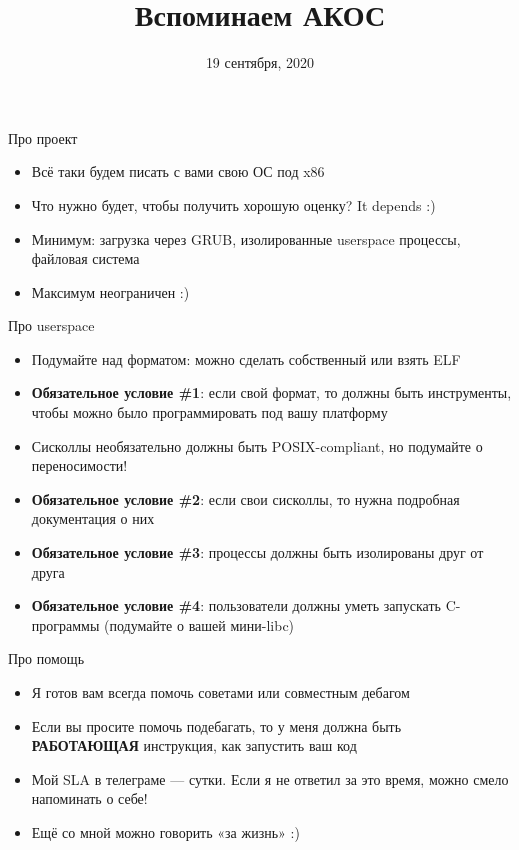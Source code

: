 \documentclass[10pt,pdf,hyperref={unicode}]{beamer}
\title{Вспоминаем АКОС}
\date{19 сентября, 2020}
\begin{document}
\begin{frame}
  \titlepage
\end{frame}

\begin{frame}{Про проект}
\begin{itemize}
    \item Всё таки будем писать с вами свою ОС под x86
    \item Что нужно будет, чтобы получить хорошую оценку?  It depends :)
    \item Минимум: загрузка через GRUB, изолированные userspace процессы, файловая система
    \item Максимум неограничен :)
\end{itemize}
\end{frame}

\begin{frame}{Про userspace}
\begin{itemize}
    \item Подумайте над форматом: можно сделать собственный или взять ELF
    \item \textbf{Обязательное условие \#1}: если свой формат, то должны быть инструменты, чтобы можно было программировать под вашу платформу
    \item Сисколлы необязательно должны быть POSIX-compliant, но подумайте о переносимости!
    \item \textbf{Обязательное условие \#2}: если свои сисколлы, то нужна подробная документация о них
    \item \textbf{Обязательное условие \#3}: процессы должны быть изолированы друг от друга
    \item \textbf{Обязательное условие \#4}: пользователи должны уметь запускать C-программы (подумайте о вашей мини-libc)
\end{itemize}
\end{frame}

\begin{frame}{Про помощь}
\begin{itemize}
    \item Я готов вам всегда помочь советами или совместным дебагом
    \item Если вы просите помочь подебагать, то у меня должна быть \textbf{РАБОТАЮЩАЯ} инструкция, как запустить ваш код
    \item Мой SLA в телеграме — сутки. Если я не ответил за это время, можно смело напоминать о себе!
    \item Ещё со мной можно говорить «за жизнь» :)
\end{itemize}
\end{frame}
\end{document}
